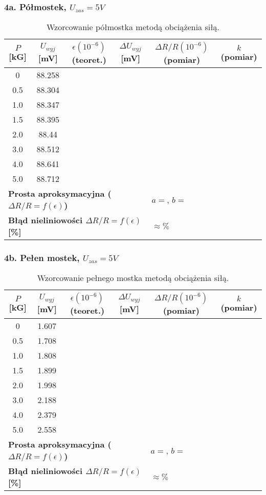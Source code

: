\documentclass[12pt, a4paper]{article}
\begin{document}
	\subsubsection{4a. Półmostek, $U_{zas} = 5 V$}
	 
	 \begin{table}[H]
	 	\centering
	 	\caption{Wzorcowanie półmostka metodą obciążenia siłą.}
	 	\begin{tabular}{cccccc}
	 		\toprule
	 		$P$ [kG] & $U_{wyj}$ [mV] & $\epsilon (10^{-6})$ (teoret.) & $\Delta U_{wyj}$ [mV] & $\Delta R/R (10^{-6})$ (pomiar) & $k$ (pomiar) \\
	 		\midrule
	 		0 & 88.258\\
	 		0.5 & 88.304 & \\
	 		1.0 & 88.347 & \\
	 		1.5 & 88.395 &  \\
	 		2.0 & 88.44 &\\
	 		3.0 & 88.512 & \\
	 		4.0 & 88.641 &\\
	 		5.0 & 88.712 & \\
	 		\midrule
	 		\multicolumn{4}{l}{\textbf{Prosta aproksymacyjna ($\Delta R/R = f(\epsilon)$)}} & \multicolumn{2}{l}{$a = $, $b = $} \\
	 		\multicolumn{4}{l}{\textbf{Błąd nieliniowości $\Delta R/R = f(\epsilon)$ [\%]}} & \multicolumn{2}{l}{$\approx  \%$} \\
	 		\bottomrule
	 	\end{tabular}
	 \end{table}
	
	\subsubsection{4b. Pełen mostek, $U_{zas} = 5 V$}
	
	\begin{table}[H]
		\centering
		\caption{Wzorcowanie pełnego mostka metodą obciążenia siłą.}
		\begin{tabular}{cccccc}
			\toprule
			$P$ [kG] & $U_{wyj}$ [mV] & $\epsilon (10^{-6})$ (teoret.) & $\Delta U_{wyj}$ [mV] & $\Delta R/R (10^{-6})$ (pomiar) & $k$ (pomiar) \\
			\midrule
			 0 & 1.607 \\
			 0.5 & 1.708 \\
			 1.0 & 1.808 \\
			 1.5 & 1.899\\
			 2.0 & 1.998\\
			 3.0 & 2.188 \\
			 4.0 & 2.379\\
			 5.0 & 2.558 \\
			\midrule
			\multicolumn{4}{l}{\textbf{Prosta aproksymacyjna ($\Delta R/R = f(\epsilon)$)}} & \multicolumn{2}{l}{$a = $, $b = $} \\
			\multicolumn{4}{l}{\textbf{Błąd nieliniowości $\Delta R/R = f(\epsilon)$ [\%]}} & \multicolumn{2}{l}{$\approx  \%$} \\
			\bottomrule
		\end{tabular}
	\end{table}
	
\end{document}
